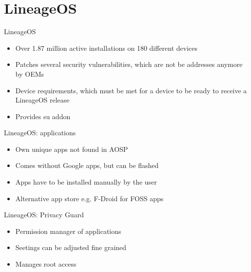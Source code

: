 \documentclass[
    11pt,%
    aspectratio=169,%
]{beamer}
\begin{document}
%
%
\section{LineageOS}

\begin{frame}{LineageOS}
	\begin{itemize}
    \item Over 1.87 million active installations on 180 different devices\newline
    \item Patches several security vulnerabilities, which are not be addresses anymore by OEMs\newline
    \item Device requirements, which must be met for a device to be ready to receive a LineageOS release\newline
    \item Provides su addon
  \end{itemize}
\end{frame}

\begin{frame}{LineageOS: applications}
\begin{itemize}
  \item Own unique apps not found in AOSP\newline
  \item Comes without Google apps, but can be flashed\newline
  \item Apps have to be installed manually by the user\newline
  \item Alternative app store e.g. F-Droid for FOSS apps
\end{itemize}
\end{frame}


\begin{frame}{LineageOS: Privacy Guard}
\begin{itemize}
  \item Permission manager of applications\newline
  \item Seetings can be adjusted fine grained\newline
  \item Manages root access
\end{itemize}
\end{frame}
\end{document}
